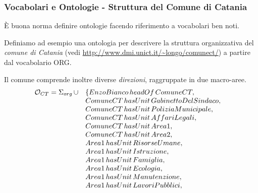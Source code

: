 \documentclass[8pt]{beamer}
\begin{document}
\begin{frame}
\frametitle{Vocabolari e Ontologie - Struttura del Comune di Catania}
\`E buona norma definire ontologie facendo riferimento a vocabolari
ben noti.
\vspace{\baselineskip}

Definiamo ad esempio una ontologia per descrivere la struttura
organizzativa del \emph{comune di Catania} (vedi \url{http://www.dmi.unict.it/~longo/comunect/})
a partire dal vocabolario ORG.
\vspace{\baselineskip}

Il comune comprende inoltre diverse \emph{direzioni}, raggruppate in due macro-aree. 
\[
\begin{array}{rll}
\mathcal{O}_{CT} = \Sigma_{org}\,\cup & \{ EnzoBianco\,headOf\,ComuneCT, & \\
& ComuneCT\,hasUnit\,GabinettoDelSindaco, & \\
& ComuneCT\,hasUnit\,PoliziaMunicipale, & \\
& ComuneCT\,hasUnit\,AffariLegali, & \\
& ComuneCT\,hasUnit\,Area1, & \\
& ComuneCT\,hasUnit\,Area2, & \\
& Area1\,hasUnit\,RisorseUmane,\\
& Area1\,hasUnit\,Istruzione,\\
& Area1\,hasUnit\,Famiglia, \\
& Area1\,hasUnit\,Ecologia,\\
&Area1\,hasUnit\,Manutenzione,\\
&Area1\,hasUnit\,LavoriPubblici,\\
\end{array} 
\]
\end{frame}
\end{document}
